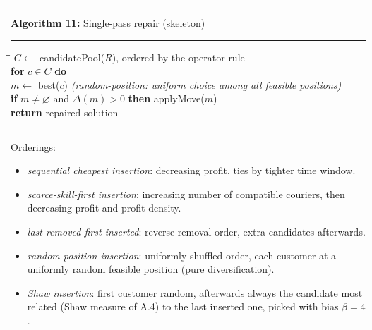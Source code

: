 \documentclass[10pt, a4paper]{article}
\begin{document}
\begin{center}
\begin{minipage}{0.92\linewidth}
\small
\hrule\vspace{2pt}
\textbf{Algorithm 11:} Single-pass repair (skeleton)
\vspace{2pt}\hrule\vspace{4pt}
\begin{tabbing}
\hspace{1.2em}\=\hspace{1.2em}\=\kill
$C \leftarrow$ candidatePool($R$), ordered by the operator rule\\
\textbf{for} $c \in C$ \textbf{do}\\
\>$m \leftarrow$ best($c$)
  \quad\emph{(random-position: uniform choice among all feasible
  positions)}\\
\>\textbf{if} $m \neq \varnothing$ and $\Delta(m) > 0$ \textbf{then}
  applyMove($m$)\\
\textbf{return} repaired solution
\end{tabbing}
\vspace{2pt}\hrule
\end{minipage}
\end{center}

\noindent Orderings:
\begin{itemize}\itemsep1pt
\item \emph{sequential cheapest insertion}: decreasing profit, ties by
  tighter time window.
\item \emph{scarce-skill-first insertion}: increasing number of compatible
  couriers, then decreasing profit and profit density.
\item \emph{last-removed-first-inserted}: reverse removal order, extra
  candidates afterwards.
\item \emph{random-position insertion}: uniformly shuffled order, each
  customer at a uniformly random feasible position (pure
  diversification).
\item \emph{Shaw insertion}: first customer random, afterwards always the
  candidate most related (Shaw measure of A.4) to the last inserted one,
  picked with bias $\beta = 4$.
\end{itemize}
\end{document}
